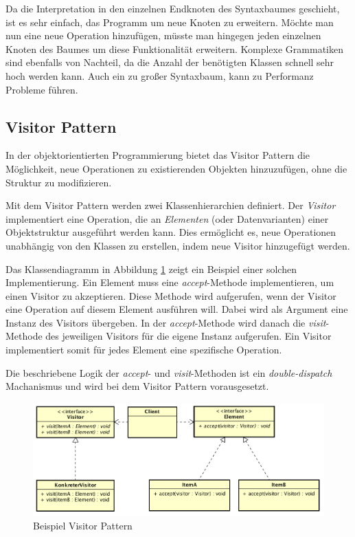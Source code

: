 \documentclass{llncs}
\begin{document}
Da die Interpretation in den einzelnen Endknoten des Syntaxbaumes geschieht, ist es sehr einfach, das Programm um neue Knoten zu erweitern. Möchte man nun eine neue Operation hinzufügen, müsste man hingegen jeden einzelnen Knoten des Baumes um diese Funktionalität erweitern. Komplexe Grammatiken sind ebenfalls von Nachteil, da die Anzahl der benötigten Klassen schnell sehr hoch werden kann. Auch ein zu großer Syntaxbaum, kann zu Performanz Probleme führen. 
\cite{hills2011case}

\subsection{Visitor Pattern} \label{sec:visitor}
In der objektorientierten Programmierung bietet das Visitor Pattern die Möglichkeit, neue Operationen zu existierenden Objekten hinzuzufügen, ohne die Struktur zu modifizieren.

Mit dem Visitor Pattern werden zwei Klassenhierarchien definiert. Der \textit{Visitor} implementiert eine Operation, die an \textit{Elementen} (oder Datenvarianten) einer Objektstruktur ausgeführt werden kann. Dies ermöglicht es, neue Operationen unabhängig von den Klassen zu erstellen, indem neue Visitor hinzugefügt werden. \cite{GHJV94}

Das Klassendiagramm in Abbildung \ref{fig:visitor-pattern} zeigt ein Beispiel einer solchen Implementierung. Ein Element muss eine \textit{accept}-Methode implementieren, um einen Visitor zu akzeptieren. Diese Methode wird aufgerufen, wenn der Visitor eine Operation auf diesem Element ausführen will. Dabei wird als Argument eine Instanz des Visitors übergeben. In der \textit{accept}-Methode wird danach die \textit{visit}-Methode des jeweiligen Visitors für die eigene Instanz aufgerufen. Ein Visitor implementiert somit für jedes Element eine spezifische Operation.

Die beschriebene Logik der \textit{accept}- und \textit{visit}-Methoden ist ein \textit{double-dispatch} Machanismus und wird bei dem Visitor Pattern vorausgesetzt.

\begin{figure}[h]
	\centering
	\includegraphics[width=\textwidth]{images/VisitorPattern.png}
	\caption{Beispiel Visitor Pattern}
	\label{fig:visitor-pattern}
\end{figure}
\end{document}
